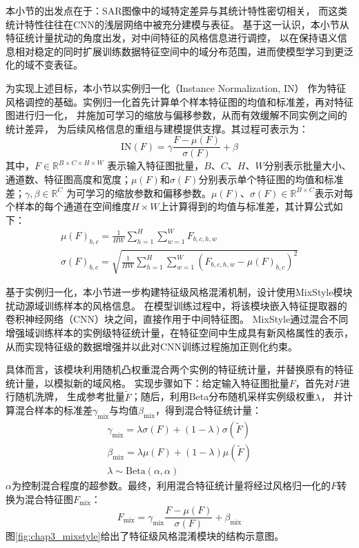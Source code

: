 本小节的出发点在于：SAR图像中的域特定差异与其统计特性密切相关，
而这类统计特性往往在CNN的浅层网络中被充分建模与表征。
基于这一认识，本小节从特征统计量扰动的角度出发，对中间特征的风格信息进行调控，
以在保持语义信息相对稳定的同时扩展训练数据特征空间中的域分布范围，进而使模型学习到更泛化的域不变表征。

为实现上述目标，本小节以实例归一化（Instance Normalization, IN）\cite{huang2017arbitrary}
作为特征风格调控的基础。实例归一化首先计算单个样本特征图的均值和标准差，再对特征图进行归一化，
并施加可学习的缩放与偏移参数，从而有效缓解不同实例之间的统计差异，
为后续风格信息的重组与建模提供支撑。其过程可表示为：
\begin{equation}
\mathrm{IN}(F) = \gamma \frac{F - \mu(F)}{\sigma(F)} + \beta
\end{equation}
其中，$F \in \mathbb{R}^{B \times C \times H \times W}$ 表示输入特征图批量，$B$、$C$、$H$、$W$分别表示批量大小、通道数、特征图高度和宽度；$\mu(F)$和$\sigma(F)$分别表示单个特征图的均值和标准差；$\gamma, \beta \in \mathbb{R}^C$ 为可学习的缩放参数和偏移参数。$\mu(F)$、$\sigma(F) \in \mathbb{R}^{B \times C}$表示对每个样本的每个通道在空间维度$H \times W$上计算得到的均值与标准差，其计算公式如下：
\begin{gather}
\mu(F)_{b,c} = \frac{1}{HW} \sum_{h=1}^{H} \sum_{w=1}^{W} F_{b,c,h,w}\\
\sigma(F)_{b,c} = \sqrt{\frac{1}{HW} \sum_{h=1}^{H} \sum_{w=1}^{W} \left( F_{b,c,h,w} - \mu(F)_{b,c} \right)^2}
\end{gather}

基于实例归一化，本小节进一步构建特征级风格混淆机制，设计使用MixStyle模块扰动源域训练样本的风格信息。
在模型训练过程中，将该模块嵌入特征提取器的卷积神经网络（CNN）块之间，直接作用于中间特征图。
MixStyle通过混合不同增强域训练样本的实例级特征统计量，在特征空间中生成具有新风格属性的表示，
从而实现特征级的数据增强并以此对CNN训练过程施加正则化约束。

具体而言，该模块利用随机凸权重混合两个实例的特征统计量，并替换原有的特征统计量，以模拟新的域风格。
实现步骤如下：给定输入特征图批量$F$，首先对$F$进行随机洗牌，
生成参考批量$\tilde{F}$；随后，利用Beta分布随机采样实例级权重$\lambda$，
并计算混合样本的标准差$\gamma_{\text{mix}}$与均值$\beta_{\text{mix}}$，得到混合特征统计量：
\begin{gather}
\gamma_{\text{mix}} = \lambda \sigma(F) + (1 - \lambda) \sigma(\tilde{F})\\
\beta_{\text{mix}} = \lambda \mu(F) + (1 - \lambda) \mu(\tilde{F})\\
\lambda \sim \text{Beta}(\alpha, \alpha)
\end{gather}
$\alpha$为控制混合程度的超参数。最终，利用混合特征统计量将经过风格归一化的$F$转换为混合特征图$F_{\text{mix}}$：
\begin{equation}
F_{\text{mix}} = \gamma_{\text{mix}} \frac{F - \mu(F)}{\sigma(F)} + \beta_{\text{mix}}
\end{equation}
图\ref{fig:chap3_mixstyle}给出了特征级风格混淆模块的结构示意图。

